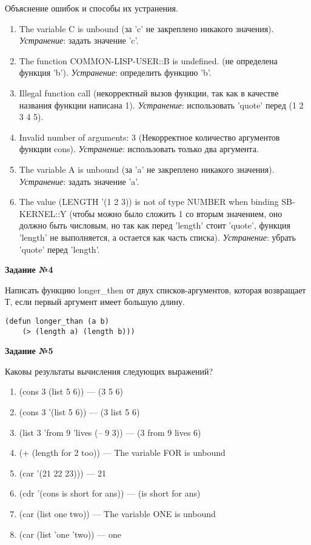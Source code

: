 Объяснение ошибок и способы их устранения.
\begin{enumerate}
    \item The variable C is unbound (за 'c' не закреплено никакого значения). \textit{Устранение}: задать значение 'c'.
    \item The function COMMON-LISP-USER::B is undefined. (не определена функция 'b'). \textit{Устранение}: определить функцию 'b'.
    \item Illegal function call (некорректный вызов функции, так как в качестве названия функции написана 1). \textit{Устранение}: использовать 'quote' перед (1 2 3 4 5).
    \item Invalid number of arguments: 3 (Некорректное количество аргументов функции cons). \textit{Устранение}: использовать только два аргумента.
    \item The variable A is unbound (за 'a' не закреплено никакого значения). \textit{Устранение}: задать значение 'a'.
    \item The value (LENGTH '(1 2 3)) is not of type NUMBER when binding SB-KERNEL::Y (чтобы можно было сложить 1 со вторым значением, оно должно быть числовым, но так как перед 'length' стоит 'quote', функция 'length' не выполняется, а остается как часть списка). \textit{Устранение}: убрать 'quote' перед 'length'.
\end{enumerate}

\textbf{Задание №4}

Написать функцию longer\_then от двух списков-аргументов, которая возвращает Т, если первый аргумент имеет большую длину.

\begin{center}
    \captionsetup{justification=raggedright,singlelinecheck=off}
    \begin{lstlisting}[label=lst:task_2,caption=Код функции]
    (defun longer_than (a b)
    (> (length a) (length b)))
\end{lstlisting}
\end{center}

\textbf{Задание №5}

Каковы результаты вычисления следующих выражений?
\begin{enumerate}
    \item (cons 3 (list 5 6)) --- (3 5 6)
    \item (cons 3 '(list 5 6)) --- (3 list 5 6)
    \item (list 3 'from 9 'lives (-- 9 3)) --- (3 from 9 lives 6)
    \item (+ (length for 2 too)) --- The variable FOR is unbound
    \item (car '(21 22 23)))  --- 21
    \item (cdr '(cons is short for ans)) --- (is short for ans)
    \item (car (list one two)) --- The variable ONE is unbound
    \item (car (list 'one 'two)) --- one
\end{enumerate}

